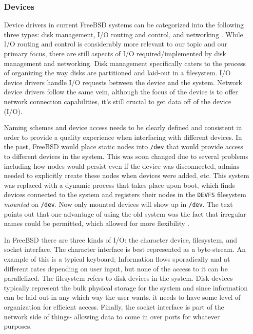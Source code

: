\documentclass[10pt,draftclsnofoot,onecolumn]{IEEEtran}
\begin{document}
\subsubsection{Devices}
\label{sub:Devices FreeBSD}
\par Device drivers in current FreeBSD systems can be categorized into the following three types: disk management, I/O routing and control, and networking \cite{bsd:1}.
While I/O routing and control is considerably more relevant to our topic and our primary focus, there are still aspects of I/O required/implemented by disk management and networking.
Disk management specifically caters to the process of organizing the way disks are partitioned and laid-out in a filesystem.
I/O device drivers handle I/O requests between the device and the system.
Network device drivers follow the same vein, although the focus of the device is to offer network connection capabilities, it's still crucial to get data off of the device (I/O).

\par Naming schemes and device access needs to be clearly defined and consistent in order to provide a quality experience when interfacing with different devices.
In the past, FreeBSD would place static nodes into \texttt{/dev} that would provide access to different devices in the system.
This was soon changed due to several problems including how nodes would persist even if the device was disconnected, admins needed to explicitly create these nodes when devices were added, etc.
This system was replaced with a dynamic process that takes place upon boot, which finds devices connected to the system and registers their nodes in the \texttt{DEVFS} filesystem \textit{mounted} on \texttt{/dev}.
Now only mounted devices will show up in \texttt{/dev}.
The text points out that one advantage of using the old system was the fact that irregular names could be permitted, which allowed for more flexibility \cite{bsd:1}.

\par In FreeBSD there are three kinds of I/O: the character device, filesystem, and socket interface.
The character interface is best represented as a byte-stream.
An example of this is a typical keyboard; Information flows sporadically and at different rates depending on user input, but none of the access to it can be parallelized.
The filesystem refers to disk devices in the system.
Disk devices typically represent the bulk physical storage for the system and since information can be laid out in any which way the user wants, it needs to have some level of organization for efficient access.
Finally, the socket interface is part of the network side of things- allowing data to come in over ports for whatever purposes.
\end{document}
